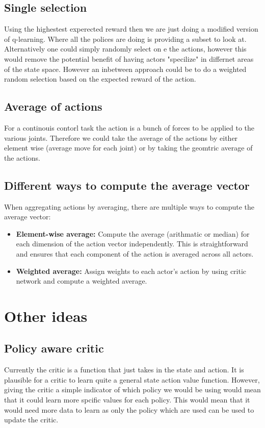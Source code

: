 \documentclass[12pt]{article}
\begin{document}
\subsection{Single selection}

Using the highestest experected reward then we are just doing a modified version of q-learning. Where all the polices are doing is providing a subset to look at. Alternatively one could simply randomly select  on e the actions, however this would remove the potential benefit of having actors "specilize" in differnet areas of the state space. However an inbetween approach could be to do a weighted random selection based on the expected reward of the action.

\subsection{Average of actions}
For a continouis contorl task the action is a bunch of forces to be applied to the various joints. Therefore we could take the average of the actions by either element wise (average move for each joint) or by taking the geomtric average of the actions.

\subsection{Different ways to compute the average vector}

When aggregating actions by averaging, there are multiple ways to compute the average vector:

\begin{itemize}
    \item \textbf{Element-wise average:} Compute the average (arithmatic or median) for each dimension of the action vector independently. This is straightforward and ensures that each component of the action is averaged across all actors.
    \item \textbf{Weighted average:} Assign weights to each actor's action by using critic network and compute a weighted average.
\end{itemize}

\section{Other ideas}

\subsection{Policy aware critic}
Currently the critic is a function that just takes in the state and action. It is plausible for a critic to learn quite a general state action value function. However, giving the critic a simple indicator of which policy we would be using would mean that it could learn more spcific values for each policy. This would mean that it would need more data to learn as only the policy which are used can be used to update the critic.
\end{document}
